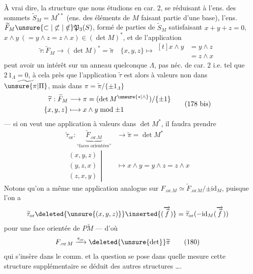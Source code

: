 À vrai dire, la structure que nous étudions en car. 2, se réduisant  à l'ens. des sommets $\widetilde S_M=M^{**}$ (ens. des éléments de $M$ faisant partie d'une base), l'ens. $\widetilde F_M\unsure{\subset|\not\subset|\notin}\mathfrak P_3(S)$, formé de parties  de $\widetilde S_M$ satisfaisant $x+y+z=0$, $x\wedge y\ (=y\wedge z=z\wedge x)\in(\det M)^*$, et de l'application
\[
 \widetilde\tau:\widetilde F_M\longrightarrow(\det M)^*=\widetilde\pi\quad
 \{x,y,z\}\longmapsto\begin{aligned}[t]x\wedge y&=y\wedge z\\&=z\wedge x\end{aligned}\tag*{(178)}
\]
peut avoir un intérêt sur un anneau quelconque $\Lambda$, pas néc. de car. 2 i.e. tel que $2\,1_\Lambda=0$, à cela près que l'application $\widetilde\tau$ est alors à valeurs non dans $\widetilde{\unsure{\pi|\Pi}}$, mais dans $\pi=\widetilde\pi/\{\pm1_\Lambda\}$
\[
\begin{aligned}
 \widetilde\tau:\widetilde F_M&\longrightarrow\pi=(\det M^{\unsure{*|\wedge}})/\{\pm1\}\\
 \{x,y,z\}&\longmapsto x\wedge y\bmod\pm1
\end{aligned}\tag*{(178 bis)}
\]
--- si on veut une application à valeurs dans $\det M^*$, il faudra prendre
\[
\begin{aligned}
 \widetilde\tau_{\mathrm{or}}:\underbrace{\widetilde F_{.\mathrm{or}.M}}_{\text{``faces orientées''}}&
 \longrightarrow\widetilde\pi=\det M^*\\
 \left.\begin{gathered}(x,y,z)\\(y,z,x)\\(z,x,y)\end{gathered}\right|&\longmapsto x\wedge y=y\wedge z=z\wedge x
\end{aligned}\tag*{(179)}
\]
Notons qu'on a même une application analogue sur $F_{.\mathrm{or}.M}\simeq\widetilde F_{.\mathrm{or}\,M}/{\pm\mathrm{id}_M}$, puisque l'on a
\[
 \widetilde\tau_{\mathrm{or}}\deleted{\unsure{(x,y,z)}}\inserted{(\overrightarrow{\widetilde f})}
 =\widetilde\tau_{\mathrm{or}}(-\mathrm{id}_M(\overrightarrow{\widetilde f}))
\]
pour une face orientée de $P\widetilde M$ --- d'où
\[
 F_{.\mathrm{or}\,M}\xrightarrow{\tau_{\mathrm{or}}}\deleted{\unsure{\det}}\widetilde\pi\tag*{(180)}
\]
qui  s'insère dans le  comm.
et la question se pose dans quelle mesure cette structure supplémentaire se déduit des autres structures \ldots.

